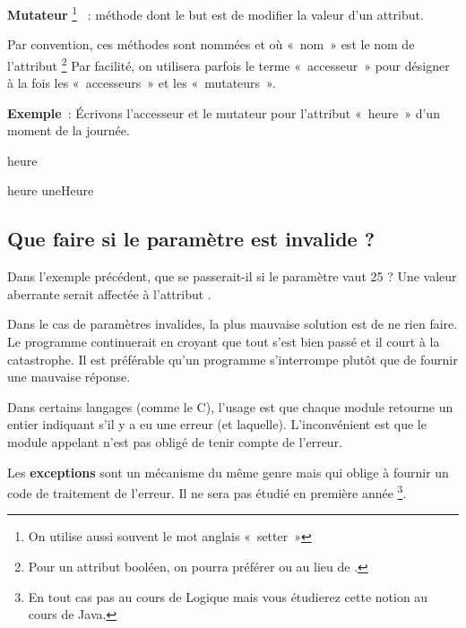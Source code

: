 	\textbf{Mutateur}%
	\footnote{On utilise aussi souvent le mot anglais «~setter~»}%
	~: méthode dont le but est de modifier la valeur d'un attribut.

	Par convention, 
	ces méthodes sont nommées  et 
	 où «~nom~» est le nom de l'attribut%
	\footnote{%
		Pour un attribut booléen, 
		on pourra préférer  ou  
		au lieu de . 
	}
	Par facilité, on utilisera parfois le terme «~accesseur~»
	pour désigner à la fois les «~accesseurs~» et les «~mutateurs~».

	\textbf{Exemple}~:
	Écrivons l'accesseur et le mutateur pour l'attribut 
	«~heure~» d'un moment de la journée.

	\begin{Pseudocode}
			\Return heure
		\EndMethod
	\end{Pseudocode}

	\begin{Pseudocode}
		\Method{setHeure}{uneHeure~: entier}{}
			\Stmt heure \Gets uneHeure
		\EndMethod
	\end{Pseudocode}

	\subsection{Que faire si le paramètre est invalide ?}
	
	Dans l'exemple précédent, 
	que se passerait-il si le paramètre  vaut 25 ? 
	Une valeur aberrante serait affectée à l'attribut .

	Dans le cas de paramètres invalides, 
	la plus mauvaise solution est de ne rien faire. 
	Le programme continuerait en croyant que tout s’est bien
	passé et il court à la catastrophe. 
	Il est préférable qu’un programme s'interrompe 
	plutôt que de fournir une mauvaise réponse. 

	Dans certains langages (comme le C), 
	l’usage est que chaque module retourne un entier indiquant 
	s'il y a eu une erreur (et laquelle). 
	L’inconvénient est que le module appelant n’est pas
	obligé de tenir compte de l’erreur.

	Les \textbf{exceptions} sont un mécanisme du même genre 
	mais qui oblige à fournir un code de traitement de l’erreur. 
	Il ne sera pas étudié en première année%
	\footnote{%
		En tout cas pas au cours de Logique 
		mais vous étudierez cette notion au cours de Java.%
	}.

